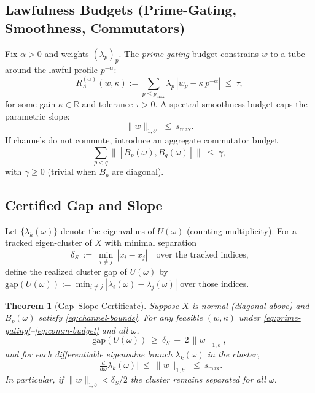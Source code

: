 \documentclass[11pt]{article}
\newtheorem{theorem}{Theorem}[section]
\theoremstyle{definition}
\theoremstyle{remark}
\newcommand{\1}{\mathbf{1}}
\begin{document}
\subsection{Lawfulness Budgets (Prime-Gating, Smoothness, Commutators)}
Fix $\alpha>0$ and weights $(\lambda_p)_{p}$. The \emph{prime-gating} budget constrains $w$ to a tube around the lawful profile $p^{-\alpha}$:
\begin{equation}
\label{eq:prime-gating}
R_{\Lambda}^{(\alpha)}(w,\kappa):=\sum_{p\le p_{\max}}\lambda_p\,|w_p-\kappa\,p^{-\alpha}|\ \le\ \tau,
\end{equation}
for some gain $\kappa\in\mathbb{R}$ and tolerance $\tau>0$. A spectral smoothness budget caps the parametric slope:
\begin{equation}
\label{eq:slope-cap}
\|w\|_{1,b'}\ \le\ s_{\max}.
\end{equation}
If channels do not commute, introduce an aggregate commutator budget
\begin{equation}
\label{eq:comm-budget}
\sum_{p<q}\|[B_p(\omega),B_q(\omega)]\|\ \le\ \gamma,
\end{equation}
with $\gamma\ge 0$ (trivial when $B_p$ are diagonal).

\subsection{Certified Gap and Slope}
Let $\{\lambda_k(\omega)\}$ denote the eigenvalues of $U(\omega)$ (counting multiplicity).
For a tracked eigen-cluster of $X$ with minimal separation
\begin{equation}
\label{eq:deltaS}
\delta_S\ :=\ \min_{i\neq j}\,|x_i-x_j|\quad \text{over the tracked indices,}
\end{equation}
define the realized cluster gap of $U(\omega)$ by 
$\mathrm{gap}(U(\omega)):=\min_{i\neq j}|\lambda_i(\omega)-\lambda_j(\omega)|$ over those indices.

\begin{theorem}[Gap--Slope Certificate]
\label{thm:gap-slope}
Suppose $X$ is normal (diagonal above) and $B_p(\omega)$ satisfy \eqref{eq:channel-bounds}.
For any feasible $(w,\kappa)$ under \eqref{eq:prime-gating}--\eqref{eq:comm-budget} and all $\omega$,
\begin{equation}
\label{eq:gap-bound}
\mathrm{gap}(U(\omega))\ \ge\ \delta_S\ -\ 2\,\|w\|_{1,b},
\end{equation}
and for each differentiable eigenvalue branch $\lambda_k(\omega)$ in the cluster,
\begin{equation}
\label{eq:slope-bound}
\bigl|\tfrac{d}{d\omega}\lambda_k(\omega)\bigr|\ \le\ \|w\|_{1,b'}\ \le\ s_{\max}.
\end{equation}
In particular, if $\|w\|_{1,b}<\delta_S/2$ the cluster remains separated for all $\omega$.
\end{theorem}
\end{document}
